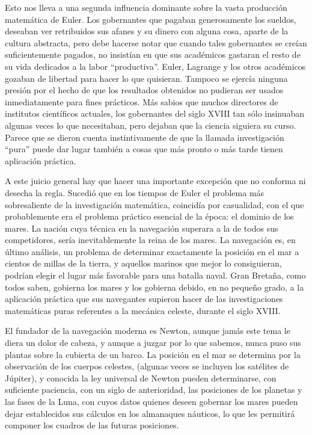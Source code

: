 \documentclass[a4paper, 12pt]{article}
\begin{document}
Esto nos lleva a una segunda influencia dominante sobre la vasta producción matemática de Euler. Los gobernantes que pagaban generosamente los sueldos, deseaban ver retribuidos sus afanes y su dinero con alguna cosa, aparte de la cultura abstracta, pero debe hacerse notar que cuando tales gobernantes se creían suficientemente pagados, no insistían en que sus académicos gastaran el resto de su vida dedicados a la labor ``productiva''. Euler, Lagrange y los otros académicos gozaban de libertad para hacer lo que quisieran. Tampoco se ejercía ninguna presión por el hecho de que los resultados obtenidos no pudieran ser usados inmediatamente para fines prácticos. Más sabios que muchos directores de institutos científicos actuales, los gobernantes del siglo XVIII tan sólo insinuaban algunas veces lo que necesitaban, pero dejaban que la ciencia siguiera su curso. Parece que se dieron cuenta instintivamente de que la llamada investigación ``pura'' puede dar lugar también a cosas que más pronto o más tarde tienen aplicación práctica.

A este juicio general hay que hacer una importante excepción que no conforma ni desecha la regla. Sucedió que en los tiempos de Euler el problema más sobresaliente de la investigación matemática, coincidía por casualidad, con el que probablemente era el problema práctico esencial de la época: el dominio de los mares. La nación cuya técnica en la navegación superara a la de todos sus competidores, sería inevitablemente la reina de los mares. La navegación es, en último análisis, un problema de determinar exactamente la posición en el mar a cientos de millas de la tierra, y aquellos marinos que mejor lo consiguieran, podrían elegir el lugar más favorable para una batalla naval. Gran Bretaña, como todos saben, gobierna los mares y los gobierna debido, en no pequeño grado, a la aplicación práctica que sus navegantes supieron hacer de las investigaciones matemáticas puras referentes a la mecánica celeste, durante el siglo XVIII.

El fundador de la navegación moderna es Newton, aunque jamás este tema le diera un dolor de cabeza, y aunque a juzgar por lo que sabemos, nunca puso sus plantas sobre la cubierta de un barco. La posición en el mar se determina por la observación de los cuerpos celestes, (algunas veces se incluyen los satélites de Júpiter), y conocida la ley universal de Newton pueden determinarse, con suficiente paciencia, con un siglo de anterioridad, las posiciones de los planetas y las fases de la Luna, con cuyos datos quienes deseen gobernar los mares pueden dejar establecidos sus cálculos en los almanaques náuticos, lo que les permitirá componer los cuadros de las futuras posiciones.
\end{document}
